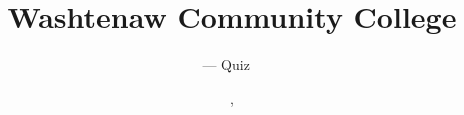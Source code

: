 \makeatletter
\def\@maketitle{%
	\newpage
	\null
	\vspace*{-5em}
	\hspace*{-1.5em}
	\begin{minipage}{.6\linewidth}
		\begin{flushleft}
			\let \footnote \thanks
			{ \Large \@title \par}%
			{\lineskip .5em%
				\noindent \@author --- \@date \par}%
			\lineskip .5em
			
		\end{flushleft}
	\end{minipage}
	\begin{minipage}{.4\linewidth}
		\begin{flushright}
		\end{flushright}
	\end{minipage}
	\vskip 0.5em}
\makeatother

\title{Washtenaw Community College}
\author{  --- Quiz ~}
\date{, }